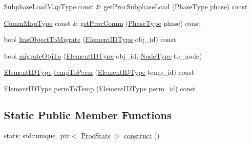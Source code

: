 \begin{DoxyCompactItemize}
\item 
\hyperlink{structvt_1_1vrt_1_1collection_1_1balance_1_1_proc_stats_ab2312e47e475143cf295d45cb2493f48}{Subphase\+Load\+Map\+Type} const  \& \hyperlink{structvt_1_1vrt_1_1collection_1_1balance_1_1_proc_stats_a56fe200ac4575869c60a02cfd628151d}{get\+Proc\+Subphase\+Load} (\hyperlink{namespacevt_a46ce6733d5cdbd735d561b7b4029f6d7}{Phase\+Type} phase) const
\item 
\hyperlink{namespacevt_1_1vrt_1_1collection_1_1balance_aa50d4cbbfa3c643e7303fc6e08f411fb}{Comm\+Map\+Type} const  \& \hyperlink{structvt_1_1vrt_1_1collection_1_1balance_1_1_proc_stats_ad8cda5635a21134657595fd34dca1f6a}{get\+Proc\+Comm} (\hyperlink{namespacevt_a46ce6733d5cdbd735d561b7b4029f6d7}{Phase\+Type} phase) const
\item 
bool \hyperlink{structvt_1_1vrt_1_1collection_1_1balance_1_1_proc_stats_a8ee38def0f38270f9b3dbbae19b027ce}{has\+Object\+To\+Migrate} (\hyperlink{namespacevt_1_1vrt_1_1collection_1_1balance_a14c8d2c972f2913aa3f1636e5be0a120}{Element\+I\+D\+Type} obj\+\_\+id) const
\item 
bool \hyperlink{structvt_1_1vrt_1_1collection_1_1balance_1_1_proc_stats_ad8a4cff0e1259002ed45b5c8f1b43d26}{migrate\+Obj\+To} (\hyperlink{namespacevt_1_1vrt_1_1collection_1_1balance_a14c8d2c972f2913aa3f1636e5be0a120}{Element\+I\+D\+Type} obj\+\_\+id, \hyperlink{namespacevt_a866da9d0efc19c0a1ce79e9e492f47e2}{Node\+Type} to\+\_\+node)
\item 
\hyperlink{namespacevt_1_1vrt_1_1collection_1_1balance_a14c8d2c972f2913aa3f1636e5be0a120}{Element\+I\+D\+Type} \hyperlink{structvt_1_1vrt_1_1collection_1_1balance_1_1_proc_stats_afed5b2ba3c677167d38ae12c012ff993}{temp\+To\+Perm} (\hyperlink{namespacevt_1_1vrt_1_1collection_1_1balance_a14c8d2c972f2913aa3f1636e5be0a120}{Element\+I\+D\+Type} temp\+\_\+id) const
\item 
\hyperlink{namespacevt_1_1vrt_1_1collection_1_1balance_a14c8d2c972f2913aa3f1636e5be0a120}{Element\+I\+D\+Type} \hyperlink{structvt_1_1vrt_1_1collection_1_1balance_1_1_proc_stats_a5b3d280cadc1a2d06de37b5d2da41ba8}{perm\+To\+Temp} (\hyperlink{namespacevt_1_1vrt_1_1collection_1_1balance_a14c8d2c972f2913aa3f1636e5be0a120}{Element\+I\+D\+Type} perm\+\_\+id) const
\end{DoxyCompactItemize}
\subsection*{Static Public Member Functions}
\begin{DoxyCompactItemize}
\item 
static std\+::unique\+\_\+ptr$<$ \hyperlink{structvt_1_1vrt_1_1collection_1_1balance_1_1_proc_stats}{Proc\+Stats} $>$ \hyperlink{structvt_1_1vrt_1_1collection_1_1balance_1_1_proc_stats_a2589f33e27eee819d91eb2c91816d34b}{construct} ()
\end{DoxyCompactItemize}

